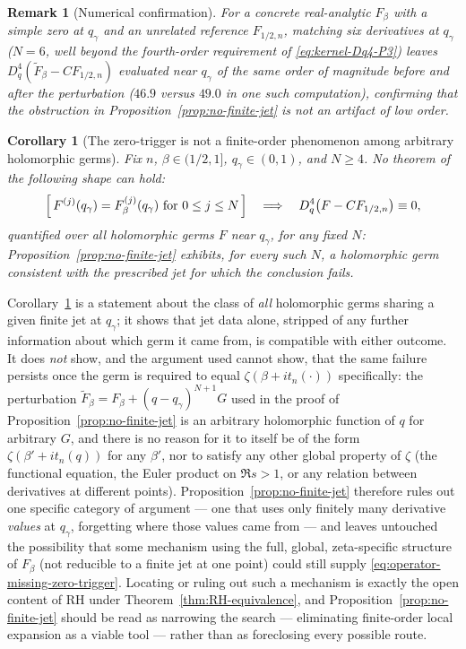 \documentclass[11pt]{amsart}
\numberwithin{equation}{section}
\newtheorem{corollary}[theorem]{Corollary}
\newtheorem{remark}[theorem]{Remark}
\begin{document}
\begin{remark}[Numerical confirmation]
\label{rem:jet-numerical}
For a concrete real-analytic $F_\beta$ with a simple zero at $q_\gamma$ and
an unrelated reference $F_{1/2,n}$, matching six derivatives at $q_\gamma$
($N=6$, well beyond the fourth-order requirement of
\eqref{eq:kernel-Dq4-P3}) leaves $D_q^4(\widetilde F_\beta-CF_{1/2,n})$
evaluated near $q_\gamma$ of the same order of magnitude before and after
the perturbation ($46.9$ versus $49.0$ in one such computation), confirming
that the obstruction in Proposition~\ref{prop:no-finite-jet} is not an
artifact of low order.
\end{remark}

\begin{corollary}[The zero-trigger is not a finite-order phenomenon among
arbitrary holomorphic germs]
\label{cor:zero-trigger-not-finite-order}
Fix $n$, $\beta\in(1/2,1]$, $q_\gamma\in(0,1)$, and $N\geq4$. No theorem of
the following shape can hold:
\begin{equation}
 \Bigl[\,F^{(j)}(q_\gamma)=F_\beta^{(j)}(q_\gamma)\text{ for }0\leq j\leq N
 \,\Bigr]
 \quad\Longrightarrow\quad
 D_q^4\bigl(F-CF_{1/2,n}\bigr)\equiv0,
 \label{eq:jet-corollary-statement}
\end{equation}
quantified over \emph{all} holomorphic germs $F$ near $q_\gamma$, for any
fixed $N$: Proposition~\ref{prop:no-finite-jet} exhibits, for every such
$N$, a holomorphic germ consistent with the prescribed jet for which the
conclusion fails.
\end{corollary}

Corollary~\ref{cor:zero-trigger-not-finite-order} is a statement about the
class of \emph{all} holomorphic germs sharing a given finite jet at
$q_\gamma$; it shows that jet data alone, stripped of any further
information about which germ it came from, is compatible with either
outcome. It does \emph{not} show, and the argument used cannot show, that
the same failure persists once the germ is required to equal
$\zeta(\beta+it_n(\cdot))$ specifically: the perturbation
$\widetilde F_\beta=F_\beta+(q-q_\gamma)^{N+1}G$ used in the proof of
Proposition~\ref{prop:no-finite-jet} is an arbitrary holomorphic function of
$q$ for arbitrary $G$, and there is no reason for it to itself be of the
form $\zeta(\beta'+it_n(q))$ for any $\beta'$, nor to satisfy any other
global property of $\zeta$ (the functional equation, the Euler product on
$\Re s>1$, or any relation between derivatives at different points).
Proposition~\ref{prop:no-finite-jet} therefore rules out one specific
category of argument --- one that uses only finitely many derivative
\emph{values} at $q_\gamma$, forgetting where those values came from --- and
leaves untouched the possibility that some mechanism using the full,
global, zeta-specific structure of $F_\beta$ (not reducible to a finite jet
at one point) could still supply
\eqref{eq:operator-missing-zero-trigger}. Locating or ruling out such a
mechanism is exactly the open content of RH under
Theorem~\ref{thm:RH-equivalence}, and Proposition~\ref{prop:no-finite-jet}
should be read as narrowing the search --- eliminating finite-order local
expansion as a viable tool --- rather than as foreclosing every possible
route.
\end{document}

